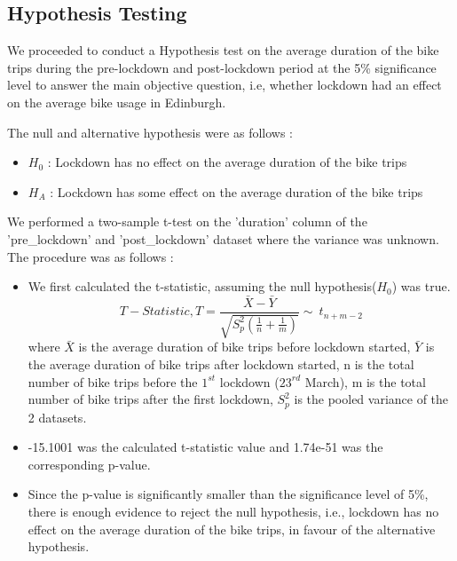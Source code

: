 \documentclass[11pt,a4paper]{article}
\begin{document}
\subsection{Hypothesis Testing}
\vspace{-5mm}
We proceeded to conduct a Hypothesis test on the average duration of the bike trips during the pre-lockdown and post-lockdown period at the 5\% significance level to answer the main objective question, i.e, whether lockdown had an effect on the average bike usage in Edinburgh.
\par
The null and alternative hypothesis were as follows :
\vspace{-5mm}
\begin{itemize}
  \item \(H_{0}\) : Lockdown has no effect on the average duration of the bike trips
  \item \(H_{A}\) : Lockdown has some effect on the average duration of the bike trips
\end{itemize}
We performed a two-sample t-test on the 'duration' column of the 'pre\_lockdown' and 'post\_lockdown' dataset where the variance was unknown. The procedure was as follows :
\vspace{-5mm}
\begin{itemize}
    \item We first calculated the t-statistic, assuming the null hypothesis(\(H_0\)) was true. \vspace{1mm}\[T-Statistic, T = \frac{\bar{X}-\bar{Y}}{\sqrt{S_p^2(\frac{1}{n} + \frac{1}{m})}} \sim\ t_{n+m-2}\]
    where $\bar{X}$ is the average duration of bike trips before lockdown started, $\bar{Y}$ is the average duration of bike trips after lockdown started, n is the total number of bike trips before the \(1^{st}\) lockdown (\(23^{rd}\) March), m is the total number of bike trips after the first lockdown, \(S_p^2\) is the pooled variance of the 2 datasets.
    \item -15.1001 was the calculated t-statistic value and 1.74e-51 was the corresponding p-value. 
    \item Since the p-value is significantly smaller than the significance level of 5\%, there is enough evidence to reject the null hypothesis, i.e., lockdown has no effect on the average duration of the bike trips, in favour of the alternative hypothesis.
\end{itemize}
\end{document}
